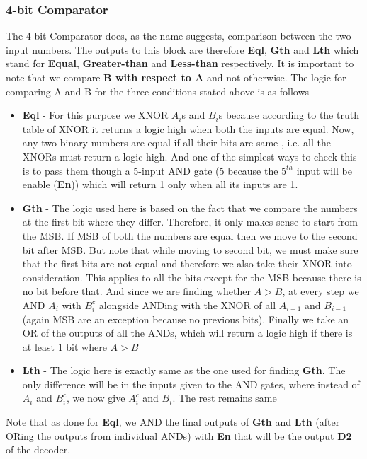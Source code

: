 \documentclass[a4paper, titlepage]{article}
\begin{document}
\subsubsection{4-bit Comparator}
The 4-bit Comparator does, as the name suggests, comparison between the two input numbers. The outputs to this 
block are therefore \textbf{Eql}, \textbf{Gth} and \textbf{Lth} which stand for \textbf{Equal}, \textbf{Greater-than} and 
\textbf{Less-than} respectively. It is important to note that we compare \textbf{B with respect to A} and not otherwise. 
The logic for comparing A and B for the three conditions stated above is as follows-
\begin{itemize}
    \item \textbf{Eql} - For this purpose we XNOR $A_i$s and $B_i$s because according to the truth table of XNOR 
    it returns a logic high when both the inputs are equal. Now, any two binary numbers are equal if all their bits are same
    , i.e. all the XNORs must return a logic high. And one of the simplest ways to check this is to pass them though a 
    5-input AND gate (5 because the $5^{th}$ input will be enable (\textbf{En})) which will return 1 only when all its 
    inputs are 1.
    \item \textbf{Gth} - The logic used here is based on the fact that we compare the numbers at the first bit where they differ.
    Therefore, it only makes sense to start from the MSB. If MSB of both the numbers are equal then we move to the second bit
    after MSB. But note that while moving to second bit, we must make sure that the first bits are not equal and therefore we
    also take their XNOR into consideration. This applies to all the bits except for the MSB because there is no bit before that.
    And since we are finding whether $A>B$, at every step we AND $A_i$ with $B_i^c$ alongside ANDing with the XNOR of  all $A_{i-1}$
    and $B_{i-1}$ (again MSB are an exception because no previous bits). Finally we take an OR of the outputs of all the ANDs, which
    will return a logic high if there is at least 1 bit where $A>B$
    \item \textbf{Lth} - The logic here is exactly same as the one used for finding \textbf{Gth}. The only difference will be in the 
    inputs given to the AND gates, where instead of $A_i$ and $B_i^c$, we now give $A_i^c$ and $B_i$. The rest remains same
\end{itemize}
Note that as done for \textbf{Eql}, we AND the final outputs of \textbf{Gth} and \textbf{Lth} (after ORing the outputs from 
individual ANDs) with \textbf{En} that will be the output \textbf{D2} of the decoder. \newline 
\end{document}
